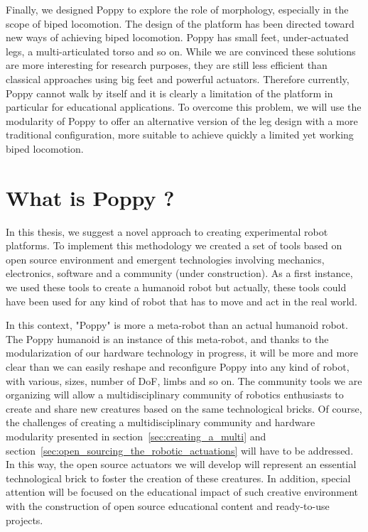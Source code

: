 Finally, we designed Poppy to explore the role of morphology, especially in the scope of biped locomotion. The design of the platform has been directed toward new ways of achieving biped locomotion. Poppy has small feet, under-actuated legs, a multi-articulated torso and so on. While we are convinced these solutions are more interesting for research purposes, they are still less efficient than classical approaches using big feet and powerful actuators.
Therefore currently, Poppy cannot walk by itself and it is clearly a limitation of the platform in particular for educational applications. To overcome this problem, we will use the modularity of Poppy to offer an alternative version of the leg design with a more traditional configuration, more suitable to achieve quickly a limited yet working biped locomotion.



\section{What is Poppy ?} %
\label{sec:what_is_poppy}

In this thesis, we suggest a novel approach to creating experimental robot platforms. To implement this methodology we created a set of tools based on open source environment and emergent technologies involving mechanics, electronics, software and a community (under construction). As a first instance, we used these tools to create a humanoid robot but actually, these tools could have been used for any kind of robot that has to move and act in the real world.

In this context, "Poppy" is more a meta-robot than an actual humanoid robot. The Poppy humanoid is an instance of this meta-robot, and thanks to the modularization of our hardware technology in progress, it will be more and more clear than we can easily reshape and reconfigure Poppy into any kind of robot, with various, sizes, number of DoF, limbs and so on. The community tools we are organizing will allow a multidisciplinary community of robotics enthusiasts to create and share new creatures based on the same technological bricks. Of course, the challenges of creating a multidisciplinary community and hardware modularity presented in section~\ref{sec:creating_a_multi} and section~\ref{sec:open_sourcing_the_robotic_actuations} will have to be addressed. In this way, the open source actuators we will develop will represent an essential technological brick to foster the creation of these creatures. In addition, special attention will be focused on the educational impact of such creative environment with the construction of open source educational content and ready-to-use projects.


